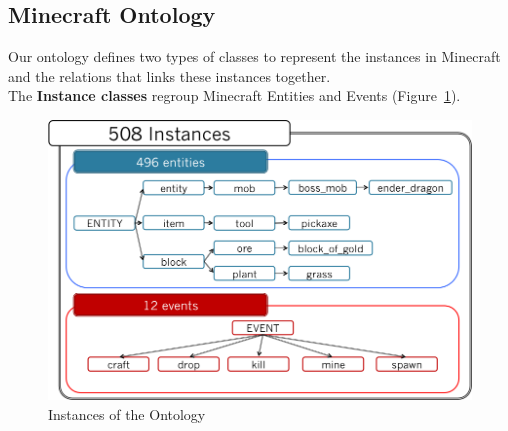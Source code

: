 \documentclass[12pt]{article}
\begin{document}
\subsection{Minecraft Ontology}
Our ontology defines two types of classes to represent the instances in Minecraft and the relations that links these instances together.\\

The \textbf{Instance classes} regroup Minecraft Entities and Events (Figure~\ref{entitiesAndEvents}).

\begin{figure}[!ht]
   \centering \includegraphics[width=0.7\linewidth]{Figures/Knowledge/entitiesAndEvents.png}
   \caption{\label{entitiesAndEvents} Instances of the Ontology}
\end{figure}
\end{document}
